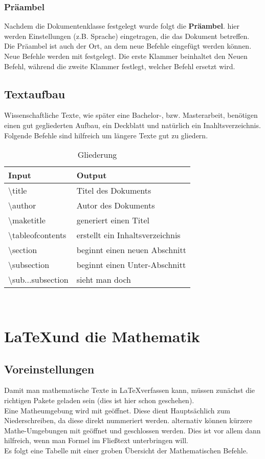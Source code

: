 \documentclass[titlepage=firstiscover]{scrartcl}
\begin{document}
\subsubsection{Präambel}
Nachdem die Dokumentenklasse festgelegt wurde folgt die \textbf{Präambel}.
hier werden Einstellungen (z.B. Sprache) eingetragen, die das Dokument betreffen.
Die Präambel ist auch der Ort, an dem neue Befehle eingefügt werden können.
Neue Befehle werden mit  festgelegt.
Die erste Klammer beinhaltet den Neuen Befehl, während die zweite
Klammer festlegt, welcher Befehl ersetzt wird.
\newpage
\subsection{Textaufbau}
Wissenschaftliche Texte, wie später eine Bachelor-, bzw. Masterarbeit, benötigen
einen gut gegliederten Aufbau, ein Deckblatt und natürlich ein Inahltsverzeichnis. \\
Folgende Befehle sind hilfreich um längere Texte gut zu gliedern.
\begin{table}
  \centering
  \caption{Gliederung}
  \label{tab:gld}
  \begin{tabular}{l l}
    \toprule
    Input & Output
    \\
    \midrule
    \textbackslash title  & Titel des Dokuments \\
    \textbackslash author  & Autor des Dokuments \\
    \textbackslash maketitle  & generiert einen Titel \\
    \textbackslash tableofcontents  & erstellt ein Inhaltsverzeichnis \\
    \textbackslash section &  beginnt einen neuen Abschnitt \\
    \textbackslash subsection  & beginnt einen Unter-Abschnitt \\
    \textbackslash sub...subsection  & sieht man doch \\
    \bottomrule
  \end{tabular}
\end{table}
\\

\newpage

\section{\LaTeX und die Mathematik}
\subsection{Voreinstellungen}
Damit man mathematische Texte in \LaTeX verfassen kann, müssen zunächst die
richtigen Pakete geladen sein (dies ist hier schon geschehen). \\
Eine Matheumgebung wird mit  geöffnet. Diese
dient Hauptsächlich zum Niederschreiben, da diese direkt nummeriert werden.
alternativ können kürzere Mathe-Umgebungen mit \fat{\$} geöffnet und geschlossen werden.
Dies ist vor allem dann hilfreich, wenn man Formel im Fließtext unterbringen will. \\
Es folgt eine Tabelle mit einer groben Übersicht der Mathematischen Befehle.
\end{document}
